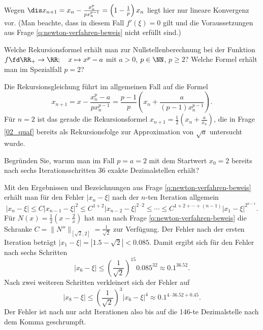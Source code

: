   \begin{antwort}
    
    Wegen $\dis x_{n+1} = x_n - 
    \frac{x_n^p}{px_n^{p-1}}
    =\left(1-\frac{1}{p} \right) x_n$ 
    liegt hier nur lineare Konvergenz vor.
    (Man beachte, dass in diesem Fall $f'(\xi)=0$ gilt und die Voraussetzungen 
    aus Frage \ref{q:newton-verfahren-beweis} nicht erfüllt sind.) 
    \AntEnd 
  \end{antwort}

  \begin{frage}
    Welche Rekursionsformel erhält man zur Nullstellenberechnung 
    bei der Funktion $f \fd \RR_+ \to \RR; \quad x\mapsto x^p-a$ mit 
    $a>0$, $p\in \NN$, $p\ge2$? Welche Formel erhält man im 
    Spezialfall $p=2$?
  \end{frage}

  \begin{antwort}
    Die Rekursionsgleichung führt im allgemeinen Fall auf die 
    Formel 
    \[
    x_{n+1} = x - \frac{x_n^p-a}{px_n^{p-1}} = 
    \frac{p-1}{p} \left( x_n + \frac{a}{(p-1)x_n^{p-1} } \right).
    \]
    Für $n=2$ ist das gerade die Rekursionsformel 
    $x_{n+1}= \frac{1}{2} \left( x_n + \frac{a}{x_n} \right)$, 
    die in Frage \ref{02_quaf} bereits  als Rekursionsfolge zur Approximation 
    von $\sqrt{a}$ untersucht wurde. 
    \AntEnd
  \end{antwort}

  \begin{frage}
    Begründen Sie, warum man im Fall $p=a=2$ mit dem Startwert 
    $x_0=2$ bereits nach sechs Iterationsschritten $36$ exakte 
    Dezimalstellen erhält?
  \end{frage}

  \begin{antwort}
    
    Mit den Ergebnissen und Bezeichnungen aus Frage 
    \ref{q:newton-verfahren-beweis} erhält man für den Fehler $| x_n-\xi |$ nach der 
    $n$-ten Iteration allgemein
    \[
    | x_n - \xi | 
    \le  C |x_{n-1}-\xi|^2 
    \le  C^{1+2} |x_{n-2}-\xi|^{2\cdot 2} 
    \le \cdots \le 
    C^{1+2+\cdots+(n-1)} 
    |x_{1}-\xi|^{2^{n-1}}.
    \]
    Für $N(x)=\frac{1}{2}\left( x- \frac{2}{x} \right)$ hat man 
    nach Frage \ref{q:newton-verfahren-beweis} 
    die Schranke $C = \| N'' \|_{[\sqrt{2},2]}=\frac{1}{\sqrt{2}}$ zur 
    Verfügung. Der Fehler nach der ersten Iteration 
    beträgt $|x_1 - \xi| = |1.5-\sqrt{2}| < 0.085$. 
    Damit ergibt sich für den Fehler nach sechs Schritten
    \[
    | x_6 - \xi | \le \left( \frac{1}{\sqrt{2}} \right)^{15} 0.085^{32} 
    \approx 0.1^{36.52}.
    \]
    Nach zwei weiteren Schritten verkleinert sich der Fehler auf 
    \[ 
    | x_8 - \xi | \le \left( \frac{1}{\sqrt{2}} \right)^3 | x_6-\xi |^4 
    \approx 0.1^{4\cdot 36.52+0.45}.
    \]
    Der Fehler ist nach nur acht Iterationen
    also bis auf die 146-te 
    Dezimalstelle nach dem Komma geschrumpft.
    \AntEnd
  \end{antwort}

